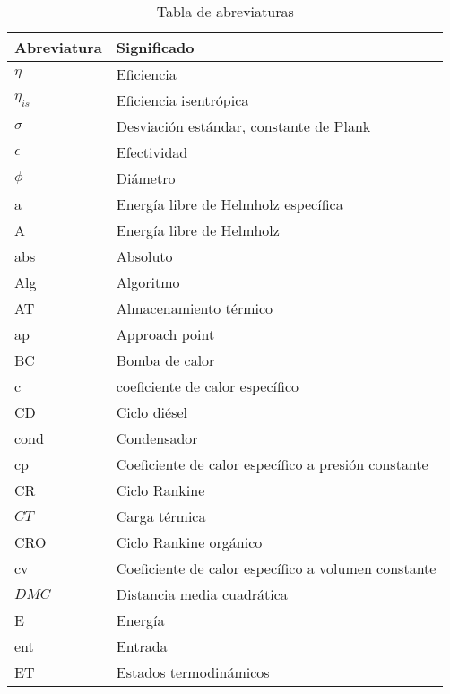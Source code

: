 
\begin{longtable}[H]{p{3.5cm}p{12cm}}
    \caption{Tabla de abreviaturas}
    \label{tab:abreviaturas} \\
        \hline
        Abreviatura           & Significado \\
        \hline
        $\eta$                & Eficiencia \\
        $\eta_{is}$           & Eficiencia isentrópica\\
        $\sigma$              & Desviación estándar, constante de Plank \\
        $\epsilon$            & Efectividad \\
        $\phi$                & Diámetro \\
        a                     & Energía libre de Helmholz específica \\
        A                     & Energía libre de Helmholz \\
        abs                   & Absoluto \\
        Alg                   & Algoritmo \\
        AT                    & Almacenamiento térmico \\
        ap                    & Approach point \\
        BC                    & Bomba de calor \\
        c                     & coeficiente de calor específico \\
        CD                    & Ciclo diésel \\
        cond                  & Condensador \\
        cp                    & Coeficiente de calor específico a presión constante \\
        CR                    & Ciclo Rankine \\
        $CT$                  & Carga térmica \\
        CRO                   & Ciclo Rankine orgánico \\
        cv                    & Coeficiente de calor específico a volumen constante \\
        $DMC$                 & Distancia media cuadrática \\
        E                     & Energía \\
        ent                   & Entrada \\
        ET                    & Estados termodinámicos \\

\end{longtable}
